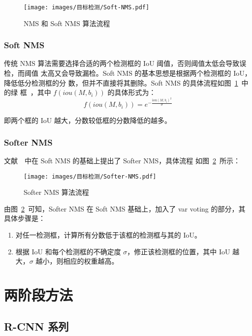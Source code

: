 \begin{figure}[ht]
  \centering
  \texttt{[image: images/目标检测/Soft-NMS.pdf]}
  \caption{NMS 和 Soft NMS 算法流程}
  \label{fig:nms-algo}
\end{figure}

\subsection{Soft NMS}
\label{subsec:soft-nms}

传统 NMS 算法需要选择合适的两个检测框的 IoU 阈值，否则阈值太低会导致误检，而阈值
太高又会导致漏检。Soft NMS 的基本思想是根据两个检测框的 IoU，降低低分检测框的分
数，但并不直接将其删除。Soft NMS 的具体流程如图~\ref{fig:nms-algo}~中的绿
框~，其中 $f(iou(M, b_i))$ 的具体形式为：
\begin{equation}
f(iou(M, b_i)) = e^{-\frac{\mathrm{iou}(M, b_i)^2}{\sigma}}
\end{equation}

即两个框的 IoU 越大，分数较低框的分数降低的越多。

\subsection{Softer NMS}
文献~~中在 Soft NMS 的基础上提出了 Softer NMS，具体流程
如图~\ref{fig:softer-nms}~所示：

\begin{figure}[ht]
  \centering
  \texttt{[image: images/目标检测/Softer-NMS.pdf]}
  \caption{Softer NMS 算法流程}
  \label{fig:softer-nms}
\end{figure}

由图~\ref{fig:softer-nms}~可知，Softer NMS 在 Soft NMS 基础上，加入了 var voting
的部分，其具体步骤是：

\begin{enumerate}
  \item 对任一检测框，计算所有分数低于该框的检测框与其的 IoU。
  \item 根据 IoU 和每个检测框的不确定度 $\sigma$，修正该检测框的位置，其中 IoU
    越大，$ \sigma $ 越小，则相应的权重越高。
\end{enumerate}

\chapter{两阶段方法}
\section{R-CNN 系列}
\label{sec:R-CNN}

